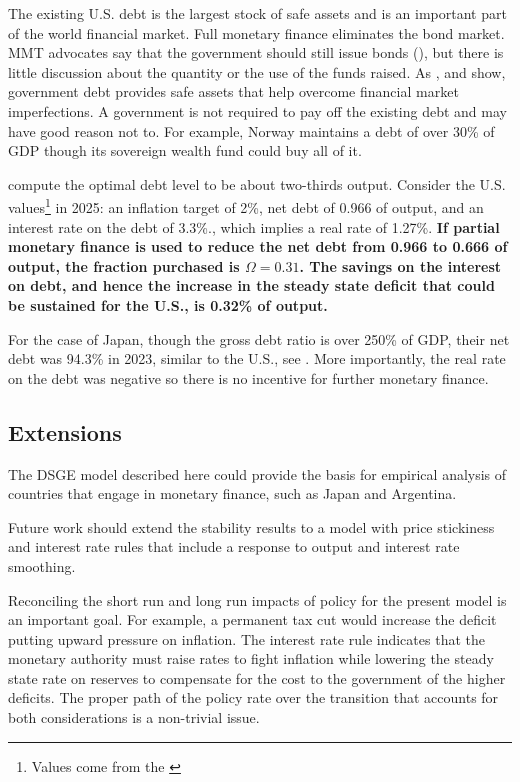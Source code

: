 \documentclass[]{article}
\begin{document}
The existing U.S. debt is the largest stock of safe assets and is an important part of the world financial market. Full monetary finance eliminates the bond market. MMT advocates say that the government should still issue bonds (\cite{mitchell2019mmt}), but there is little discussion about the quantity or the use of the funds raised. As \textcite{Woodford90debt}, \textcite{AIYAGARI98debt} and \textcite{brunnermeier2020bubble} show, government debt provides safe assets that help overcome financial market imperfections. A government is not required to pay off the existing debt and may have good reason not to. For example, Norway maintains a debt of over 30\%  of GDP though its sovereign wealth fund could buy all of it.

\textcite{AIYAGARI98debt} compute the optimal debt level to be about two-thirds output. Consider the U.S. values\footnote{Values come from the \textcite{USTreasury2025Interest}} in 2025:  an inflation target of 2\%, net debt of 0.966 of output, and an interest rate on the debt of 3.3\%., which implies a real rate of 1.27\%. \textbf{If partial monetary finance is used to reduce the net debt from 0.966 to 0.666 of output, the fraction purchased is $\Omega=0.31$. The savings on the interest on debt, and hence the increase in the steady state deficit that could be sustained for the U.S., is 0.32\% of output.}

For the case of Japan, though the gross debt ratio is over 250\% of GDP, their net debt was 94.3\% in 2023, similar to the U.S., see \textcite{chien2023japan}. More importantly, the real rate on the debt was negative so there is no incentive for further monetary finance.

\subsection{Extensions}

The DSGE model described here could provide the basis for empirical analysis of countries that engage in monetary finance, such as Japan and Argentina. 

Future work should extend the stability results to a model with price stickiness and interest rate rules that include a response to output and interest rate smoothing.

Reconciling the short run and long run impacts of policy for the present model is an important goal. For example, a permanent tax cut would increase the deficit putting upward pressure on inflation. The interest rate rule indicates that the monetary authority must raise rates to fight inflation while lowering the steady state rate on reserves to compensate for the cost to the government of the higher deficits. The proper path of the policy rate over the transition that accounts for both considerations is a non-trivial issue.
\end{document}
